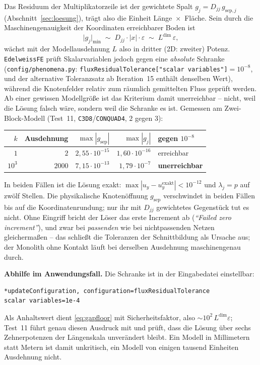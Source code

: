 \documentclass[a4paper,11pt]{article}
\def\bm#1{#1}%
\def\tilde#1{#1}%
\newcommand{\code}[1]{\texttt{\small #1}}
\newcommand{\file}[1]{\texttt{\small #1}}
\begin{document}
Das Residuum der Multiplikatorzeile ist der gewichtete Spalt
$\tilde g_j = \tilde D_{jj}\,g_{\text{sep},j}$ (Abschnitt~\ref{sec:loesung}), trägt also die
Einheit Länge~$\times$~Fläche. Sein durch die Maschinengenauigkeit der Koordinaten erreichbarer
Boden ist
\begin{equation}
\big|\tilde g_j\big|_{\min} \;\sim\; \tilde D_{jj}\cdot|\bm x|\cdot\varepsilon
\;\sim\; L^{\dim}\,\varepsilon ,
\label{eq:gapfloor}
\end{equation}
wächst mit der Modellausdehnung $L$ also in dritter (2D: zweiter) Potenz. \code{EdelweissFE}
prüft Skalarvariablen jedoch gegen eine \emph{absolute} Schranke
(\file{config/phenomena.py}: \code{fluxResidualTolerance["scalar variables"]}${}=10^{-8}$, und der
alternative Toleranzsatz ab Iteration~15 enthält denselben Wert), während die Knotenfelder relativ
zum räumlich gemittelten Fluss geprüft werden. Ab einer gewissen Modellgröße ist das Kriterium
damit unerreichbar -- nicht, weil die Lösung falsch wäre, sondern weil die Schranke es ist.
Gemessen am Zwei-Block-Modell (Test~11, \code{C3D8}/\code{CONQUAD4}, $2$ gegen $3$):

\begin{center}
\small
\begin{tabular}{rrrrl}
\toprule
$k$ & Ausdehnung & $\max|g_{\text{sep}}|$ & $\max|\tilde g_j|$ & gegen $10^{-8}$ \\
\midrule
$1$      & $2$    & $2{,}55\cdot10^{-15}$ & $1{,}60\cdot10^{-16}$ & erreichbar \\
$10^{3}$ & $2000$ & $7{,}15\cdot10^{-13}$ & $1{,}79\cdot10^{-7}$  & \textbf{unerreichbar} \\
\bottomrule
\end{tabular}
\end{center}

\noindent In beiden Fällen ist die Lösung exakt: $\max|u_y-u_y^{\text{exakt}}|<10^{-12}$ und
$\lambda_j=p$ auf zwölf Stellen. Die physikalische Knotenöffnung $g_{\text{sep}}$ verschwindet
in beiden Fällen bis auf die Koordinatenrundung; nur ihr mit $\tilde D_{jj}$ gewichtetes Gegenstück
tut es nicht. Ohne Eingriff bricht der Löser das erste Increment ab
(\emph{``Failed zero increment''}), und zwar bei \emph{passenden} wie bei nichtpassenden Netzen
gleichermaßen -- das schließt die Toleranzen der Schnittbildung als Ursache aus; der Monolith
ohne Kontakt läuft bei derselben Ausdehnung maschinengenau durch.

\medskip
\noindent\textbf{Abhilfe im Anwendungsfall.} Die Schranke ist in der Eingabedatei einstellbar:
\begin{lstlisting}[language=bash]
*updateConfiguration, configuration=fluxResidualTolerance
scalar variables=1e-4
\end{lstlisting}
Als Anhaltswert dient \eqref{eq:gapfloor} mit Sicherheitsfaktor, also
$\sim\!10^2\,L^{\dim}\varepsilon$; Test~11 führt genau diesen Ausdruck mit und prüft, dass die
Lösung über sechs Zehnerpotenzen der Längenskala unverändert bleibt. Ein Modell in Millimetern
statt Metern ist damit unkritisch, ein Modell von einigen tausend Einheiten Ausdehnung nicht.
\end{document}
